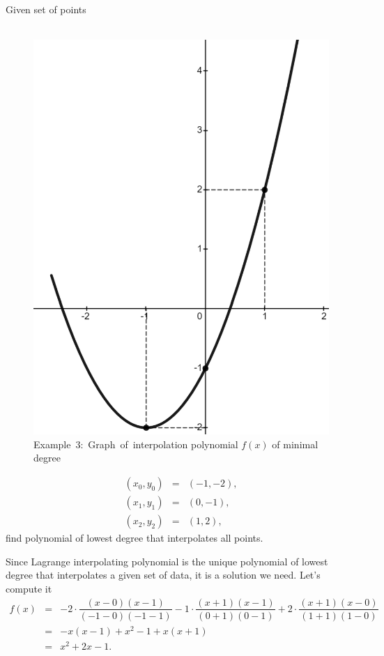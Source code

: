 \Ex Given set of points~ ~ ~ ~ ~ ~ ~ ~ ~ ~ ~ ~ ~ ~~ ~ ~ ~ ~ ~ ~ ~ ~ ~ ~ ~ ~ ~~ ~ ~ ~ ~ ~ ~ ~ ~ ~ ~ ~ ~ ~~ ~ ~ ~ ~ ~ ~ ~ ~ ~ ~ ~ ~ ~
\begin{figure}
    \includegraphics[height=0.3\columnwidth]{./lectures/images/lecture3_lagrange_example.png}
    \caption*{\small{Example~3:~Graph~of~interpolation polynomial
    $f(x)$ of minimal degree}}
\end{figure}
\begin{eqnarray}
        (x_0,y_0) &=& (-1,-2)\nonumber,\\
        (x_1,y_1) &=& (0,-1)\nonumber,\\
        (x_2,y_2) &=& (1, 2)\nonumber,
\end{eqnarray}
find polynomial of lowest degree that interpolates all points. 

Since Lagrange interpolating polynomial is the unique polynomial of lowest degree that interpolates a given set of data, it is a solution we need. Let's compute it
\begin{eqnarray}
        f(x) &=& -2 \cdot \dfrac{(x-0)(x-1)}{(-1 - 0)(-1 -1)}  - 1\cdot \dfrac{(x+1)(x-1)}{(0+1)(0-1)} + 2\cdot \dfrac{(x+1)(x-0)}{(1+1)(1-0)}\nonumber\\
         &=& -x(x-1) + x^2 - 1 + x(x+1)\nonumber\\ 
          &=& x^2 + 2x - 1.\nonumber
\end{eqnarray}
\newpage
